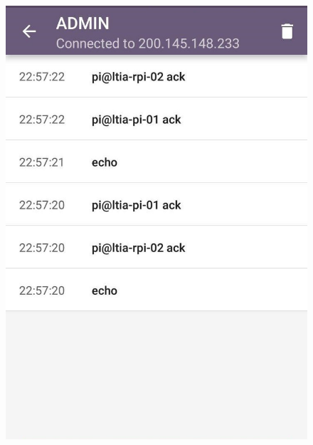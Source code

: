 \begin{figure}[htb]
\begin{minipage}{0.32\textwidth}
		\includegraphics[width=1\textwidth]{052-gateway/mqtt/ad-admin-ack.jpg}
	\end{minipage}
\end{figure}

